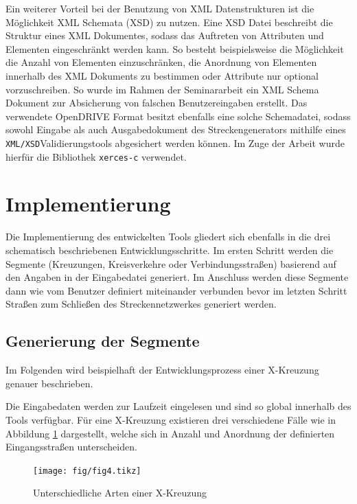 Ein weiterer Vorteil bei der Benutzung von XML Datenstrukturen ist die Möglichkeit XML Schemata (XSD) zu nutzen. Eine XSD Datei beschreibt die Struktur eines XML Dokumentes, sodass das Auftreten von Attributen und Elementen eingeschränkt werden kann. So besteht beispielsweise die Möglichkeit die Anzahl von Elementen einzuschränken, die Anordnung von Elementen innerhalb des XML Dokuments zu bestimmen oder Attribute nur optional vorzuschreiben. So wurde im Rahmen der Seminararbeit ein XML Schema Dokument zur Absicherung von falschen Benutzereingaben erstellt. Das verwendete OpenDRIVE Format besitzt ebenfalls eine solche Schemadatei, sodass sowohl Eingabe als auch Ausgabedokument des Streckengenerators mithilfe eines \texttt{XML/XSD}Validierungstools abgesichert werden können. Im Zuge der Arbeit wurde hierfür die Bibliothek \texttt{xerces-c}\cite{Xerces.2019} verwendet.

\section{Implementierung}
Die Implementierung des entwickelten Tools gliedert sich ebenfalls in die drei schematisch beschriebenen Entwicklungsschritte. Im ersten Schritt werden die Segmente (Kreuzungen, Kreisverkehre oder Verbindungsstraßen) basierend auf den Angaben in der Eingabedatei generiert. Im Anschluss werden diese Segmente dann wie vom Benutzer definiert miteinander verbunden bevor im letzten Schritt Straßen zum Schließen des Streckennetzwerkes generiert werden.

\subsection{Generierung der Segmente}
Im Folgenden wird beispielhaft der Entwicklungsprozess einer X-Kreuzung genauer beschrieben.

Die Eingabedaten werden zur Laufzeit eingelesen und sind so global innerhalb des Tools verfügbar. Für eine X-Kreuzung existieren drei verschiedene Fälle wie in Abbildung \ref{abb4} dargestellt, welche sich in Anzahl und Anordnung der definierten Eingangsstraßen unterscheiden.

\begin{figure}[H]
\flushleft
\texttt{[image: fig/fig4.tikz]}
\caption{Unterschiedliche Arten einer X-Kreuzung}
\label{abb4}
\end{figure}

